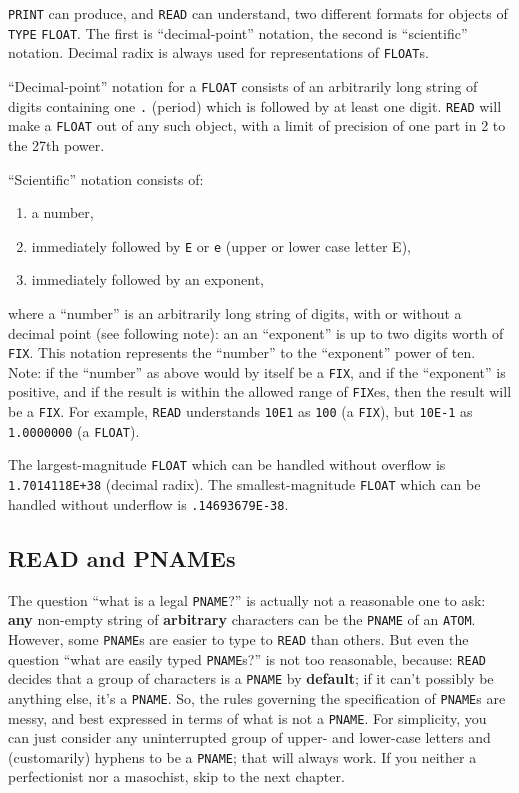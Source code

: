 \documentclass[a4paper]{scrbook}
\begin{document}
\texttt{PRINT} can produce, and \texttt{READ} can understand, two different formats for objects of
\texttt{TYPE} \texttt{FLOAT}. The first is ``decimal-point'' notation, the second is
``scientific'' notation. Decimal radix is always used for representations of \texttt{FLOAT}s.

``Decimal-point'' notation for a \texttt{FLOAT} consists of an arbitrarily long string of digits containing one \texttt{.}
(period) which is followed by at least one digit. \texttt{READ} will make a \texttt{FLOAT} out of any such object, with a
limit of precision of one part in 2 to the 27th power.

``Scientific'' notation consists of:

\begin{enumerate}
\def\labelenumi{\arabic{enumi}.}
\item
  a number,
\item
  immediately followed by \texttt{E} or \texttt{e} (upper or lower case letter E),
\item
  immediately followed by an exponent,
\end{enumerate}

where a ``number'' is an arbitrarily long string of digits, with or without a decimal point (see following note): an an
``exponent'' is up to two digits worth of \texttt{FIX}. This notation represents the ``number'' to the
``exponent'' power of ten. Note: if the ``number'' as above would by itself be a \texttt{FIX}, and if the ``exponent'' is
positive, and if the result is within the allowed range of \texttt{FIX}es, then the result will be a \texttt{FIX}. For
example, \texttt{READ} understands \texttt{10E1} as \texttt{100} (a \texttt{FIX}), but \texttt{10E-1} as \texttt{1.0000000}
(a \texttt{FLOAT}).

The largest-magnitude \texttt{FLOAT} which can be handled without overflow is \texttt{1.7014118E+38} (decimal radix). The
smallest-magnitude \texttt{FLOAT} which can be handled without underflow is \texttt{.14693679E-38}.

\subsection{READ and PNAMEs}\label{read-and-pnames}

The question ``what is a legal \texttt{PNAME}?'' is actually not a reasonable one to ask: \textbf{any} non-empty string of
\textbf{arbitrary} characters can be the \texttt{PNAME} of an \texttt{ATOM}. However, some \texttt{PNAME}s are easier to
type to \texttt{READ} than others. But even the question ``what are easily typed \texttt{PNAME}s?'' is not too reasonable,
because: \texttt{READ} decides that a group of characters is a \texttt{PNAME} by \textbf{default}; if it can't possibly be
anything else, it's a \texttt{PNAME}. So, the rules governing the specification of \texttt{PNAME}s are messy, and best
expressed in terms of what is not a \texttt{PNAME}. For simplicity, you can just consider any uninterrupted group of upper-
and lower-case letters and (customarily) hyphens to be a \texttt{PNAME}; that will always work. If you neither a
perfectionist nor a masochist, skip to the next chapter.
\end{document}
